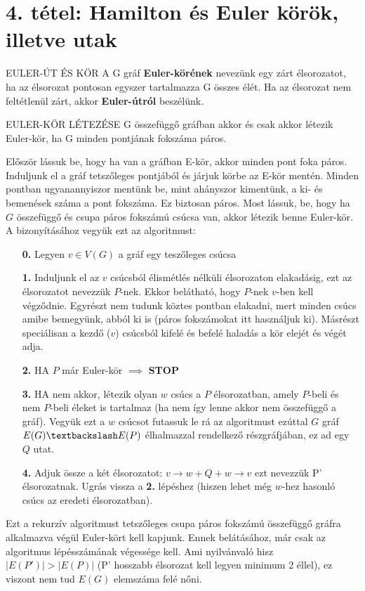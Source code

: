 \section{4. tétel: Hamilton és Euler körök, illetve utak}

\begin{definicio}{EULER-ÚT ÉS KÖR}
A G gráf \textbf{Euler-körének} nevezünk egy zárt élsorozatot, ha az élsorozat pontosan egyszer tartalmazza G összes élét. Ha az élsorozat nem feltétlenül zárt, akkor \textbf{Euler-útról} beszélünk.
\end{definicio}

\begin{tetel}{EULER-KÖR LÉTEZÉSE}
G összefüggő gráfban akkor és csak akkor létezik Euler-kör, ha G minden pontjának fokszáma páros.
\end{tetel}

\begin{bizonyitas}{}
  Először lássuk be, hogy ha van a gráfban E-kör, akkor minden pont foka páros. Induljunk el a gráf tetszőleges pontjából és járjuk körbe az E-kör mentén. Minden pontban ugyanannyiszor mentünk be, mint ahányszor kimentünk, a ki- és bemenések száma a pont fokszáma. Ez biztosan páros.
Most lássuk, be, hogy ha $G$ összefüggő és csupa páros fokszámú csúcsa van, akkor létezik benne Euler-kör. A bizonyításához vegyük ezt az algoritmust:
\begin{itemize}
\item[\textbf{0.}] Legyen $v \in V(G)$ a gráf egy teszőleges csúcsa
\item[\textbf{1.}] Induljunk el az $v$ csúcsból élismétlés nélküli élsorozaton elakadásig, ezt az élsorozatot nevezzük $P$-nek. Ekkor belátható, hogy $P$-nek $v$-ben kell végződnie. Egyrészt nem tudunk köztes pontban elakadni, mert minden csúcs amibe bemegyünk, abból ki is (páros fokszámokat itt használjuk ki). Másrészt speciálisan a kezdő ($v$) csúcsból kifelé és befelé haladás a kör elejét és végét adja.
\item[\textbf{2.}] HA $P$ már Euler-kör $\implies$ \textbf{STOP}
\item[\textbf{3.}] HA nem akkor, létezik olyan $w$ csúcs a $P$ élsorozatban, amely $P$-beli és nem $P$-beli éleket is tartalmaz (ha nem így lenne akkor nem összefüggő a gráf). Vegyük ezt a $w $ csúcsot futassuk le rá az algoritmust ezúttal $G$ gráf $E(G) \textbackslash E(P)$ élhalmazzal rendelkező részgráfjában, ez ad egy $Q$ utat.
\item[\textbf{4.}] Adjuk össze a két élsorozatot: $v \rightarrow w + Q + w \rightarrow v$ ezt nevezzük P' élsorozatnak. Ugrás vissza a \textbf{2.} lépéshez (hiszen lehet még $w$-hez hasonló csúcs az eredeti élsorozatban).
\end{itemize}
Ezt a rekurzív algoritmust tetszőleges csupa páros fokszámú összefüggő gráfra alkalmazva végül Euler-kört kell kapjunk. Ennek belátásához, már csak az algoritmus lépésszámának végessége kell. Ami nyilvánvaló hisz $|E(P')| > |E(P)|$ (P' hosszabb élsorozat kell legyen minimum 2 éllel), ez viszont nem tud $E(G)$ elemszáma felé nőni.
\end{bizonyitas}

